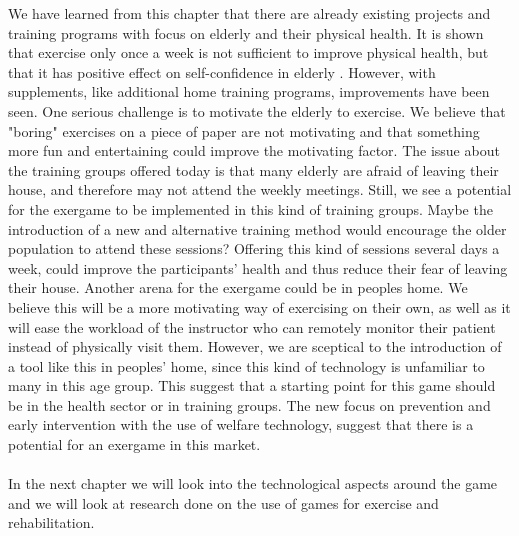 We have learned from this chapter that there are already existing projects and training programs with focus on elderly and their physical health. It is shown that exercise only once a week is not sufficient to improve physical health, but that it has positive effect on self-confidence in elderly \cite{gruppetrening-trheim}.  However, with supplements, like additional home training programs, improvements have been seen. One serious challenge is to motivate the elderly to exercise. We believe that "boring" exercises on a piece of paper are not motivating and that something more fun and entertaining could improve the motivating factor. The issue about the training groups offered today is that many elderly are afraid of leaving their house, and therefore may not attend the weekly meetings. Still, we see a potential for the exergame to be implemented in this kind of training groups. Maybe the introduction of a new and alternative training method would encourage the older population to attend these sessions? Offering this kind of sessions several days a week, could improve the participants' health and thus reduce their fear of leaving their house.  Another arena for the exergame could be in peoples home. We believe this will be a more motivating way of exercising on their own, as well as it will ease the workload of the instructor who can remotely monitor their patient instead of physically visit them. However, we are sceptical to the introduction of a tool like this in peoples' home, since this kind of technology is unfamiliar to many in this age group. This suggest that a starting point for this game should be in the health sector or in training groups.  The new focus on prevention and early intervention with the use of welfare technology, suggest that there is a potential for an exergame in this market. \\ \\
In the next chapter we will look into the technological aspects around the game and we will look at research done on the use of games for exercise and rehabilitation.

